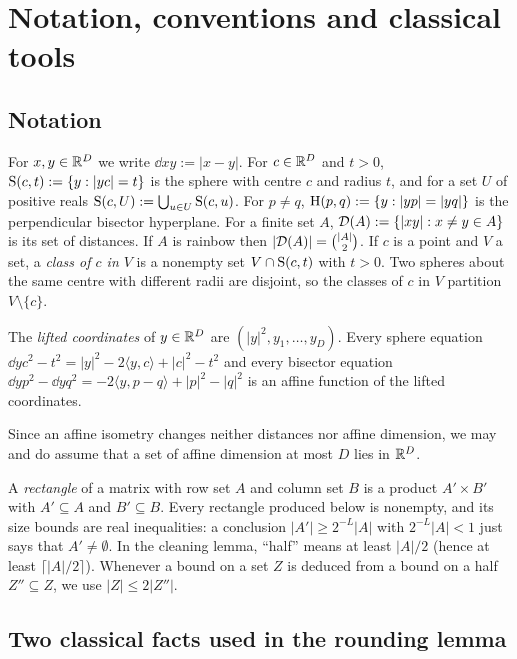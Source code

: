 \section{Notation, conventions and classical tools}\label{sec:prelim}

\subsection{Notation}
For $x,y\in\mathbb{R}^D$ we write $\dd xy:=|x-y|$. For $c\in\mathbb{R}^D$ and $t>0$, $\mathrm{S}(c,t):=\{y:|yc|=t\}$ is the sphere
with centre $c$ and radius $t$, and for a set $U$ of positive reals $\mathrm{S}(c,U):=\bigcup_{u\in U}\mathrm{S}(c,u)$. For
$p\ne q$, $\mathrm{H}(p,q):=\{y:|yp|=|yq|\}$ is the perpendicular bisector hyperplane. For a finite set $A$,
$\mathcal{D}(A):=\{|xy|: x\ne y\in A\}$ is its set of distances. If $A$ is rainbow then $|\mathcal{D}(A)|=\binom{|A|}2$. If
$c$ is a point and $V$ a set, a \emph{class of $c$ in $V$} is a nonempty set $V\cap\mathrm{S}(c,t)$ with $t>0$. Two
spheres about the same centre with different radii are disjoint, so the classes of $c$ in $V$ partition
$V\setminus\{c\}$.

The \emph{lifted coordinates} of $y\in\mathbb{R}^D$ are $(|y|^2,y_1,\dots,y_D)$. Every sphere equation
$\dd yc^2-t^2=|y|^2-2\langle y,c\rangle+|c|^2-t^2$ and every bisector equation
$\dd yp^2-\dd yq^2=-2\langle y,p-q\rangle+|p|^2-|q|^2$ is an affine function of the lifted coordinates.

Since an affine isometry changes neither distances nor affine dimension, we may and do assume that a set of
affine dimension at most $D$ lies in $\mathbb{R}^D$.

\begin{convention}\label{conv:rounding}
A \emph{rectangle} of a matrix with row set $A$ and column set $B$ is a product $A'\times B'$ with $A'\subseteq A$
and $B'\subseteq B$. Every rectangle produced below is nonempty, and its size bounds are real inequalities: a
conclusion $|A'|\ge 2^{-L}|A|$ with $2^{-L}|A|<1$ just says that $A'\ne\emptyset$. In the cleaning lemma,
``half'' means at least $|A|/2$ (hence at least $\lceil |A|/2\rceil$). Whenever a bound on a set $Z$ is deduced
from a bound on a half $Z''\subseteq Z$, we use $|Z|\le 2|Z''|$.
\end{convention}

\subsection{Two classical facts used in the rounding lemma}


